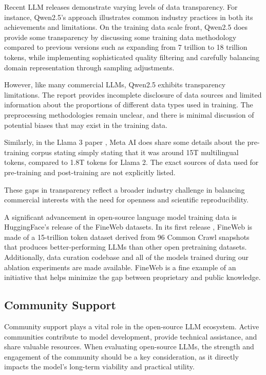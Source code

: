 Recent LLM releases demonstrate varying levels of data transparency. For instance, Qwen2.5's approach  illustrates common industry practices in both its achievements and limitations. On the training data scale front, Qwen2.5 does provide some transparency by discussing some training data methodology compared to previous versions such as expanding from 7 trillion to 18 trillion tokens, while implementing sophisticated quality filtering and carefully balancing domain representation through sampling adjustments.

However, like many commercial LLMs, Qwen2.5 exhibits transparency limitations. The report provides incomplete disclosure of data sources and limited information about the proportions of different data types used in training. The preprocessing methodologies remain unclear, and there is minimal discussion of potential biases that may exist in the training data. 

Similarly, in the Llama 3 paper , Meta AI does share some details about the pre-training corpus stating simply stating that it was around 15T multilingual tokens, compared to 1.8T tokens for Llama 2. The exact sources of data used for pre-training and post-training are not explicitly listed.

These gaps in transparency reflect a broader industry challenge in balancing commercial interests with the need for openness and scientific reproducibility.

A significant advancement in open-source language model training data is HuggingFace's release of the FineWeb datasets. In its first release , FineWeb is made of a 15-trillion token dataset derived from 96 Common Crawl snapshots that produces better-performing LLMs than other open pretraining datasets. Additionally, data curation codebase and all of the models trained during our ablation experiments are made available. FineWeb is a fine example of an initiative that helps minimize the gap between proprietary and public knowledge.

\subsection{Community Support}

Community support plays a vital role in the open-source LLM ecosystem. Active communities contribute to model development, provide technical assistance, and share valuable resources. When evaluating open-source LLMs, the strength and engagement of the community should be a key consideration, as it directly impacts the model's long-term viability and practical utility.

